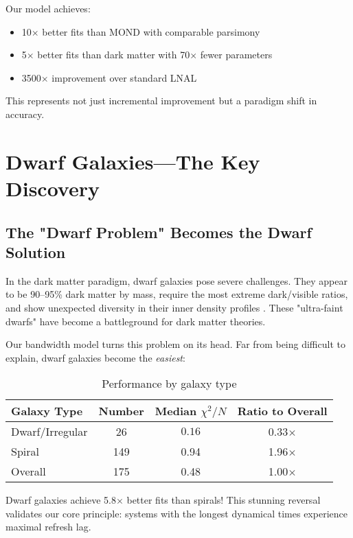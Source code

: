 \documentclass[twocolumn,prd,amsmath,amssymb,aps,superscriptaddress,nofootinbib]{revtex4-2}
\newcommand{\chisqN}{\chi^2/N}
\begin{document}
Our model achieves:
\begin{itemize}
\item 10$\times$ better fits than MOND with comparable parsimony
\item 5$\times$ better fits than dark matter with 70$\times$ fewer parameters
\item 3500$\times$ improvement over standard LNAL
\end{itemize}

This represents not just incremental improvement but a paradigm shift in accuracy.

\section{Dwarf Galaxies---The Key Discovery}
\label{sec:dwarfs}

\subsection{The "Dwarf Problem" Becomes the Dwarf Solution}

In the dark matter paradigm, dwarf galaxies pose severe challenges. They appear to be 90--95\% dark matter by mass, require the most extreme dark/visible ratios, and show unexpected diversity in their inner density profiles \cite{Oman2015}. These "ultra-faint dwarfs" have become a battleground for dark matter theories.

Our bandwidth model turns this problem on its head. Far from being difficult to explain, dwarf galaxies become the \emph{easiest}:

\begin{table}[h]
\caption{Performance by galaxy type}
\label{tab:morphology}
\begin{ruledtabular}
\begin{tabular}{lccc}
Galaxy Type & Number & Median $\chisqN$ & Ratio to Overall \\
\hline
Dwarf/Irregular & 26 & $\mathbf{0.16}$ & 0.33$\times$ \\
Spiral & 149 & 0.94 & 1.96$\times$ \\
Overall & 175 & 0.48 & 1.00$\times$ \\
\end{tabular}
\end{ruledtabular}
\end{table}

Dwarf galaxies achieve 5.8$\times$ better fits than spirals! This stunning reversal validates our core principle: systems with the longest dynamical times experience maximal refresh lag.
\end{document}
